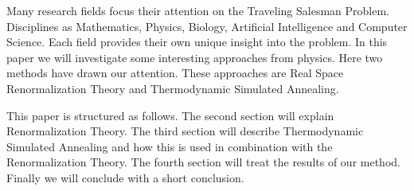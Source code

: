 Many research fields focus their attention on the Traveling Salesman Problem.
Disciplines as Mathematics, Physics, Biology, Artificial Intelligence and
Computer Science. Each field provides their own unique insight into the
problem. In this paper we will investigate some interesting approaches from
physics. Here two methods have drawn our attention. These approaches are Real
Space Renormalization Theory and Thermodynamic Simulated Annealing. 

This paper is structured as follows. The second section will explain
Renormalization Theory. The third section will describe Thermodynamic Simulated
Annealing and how this is used in combination with the Renormalization Theory.
The fourth section will treat the results of our method. Finally we will
conclude with a short conclusion.


